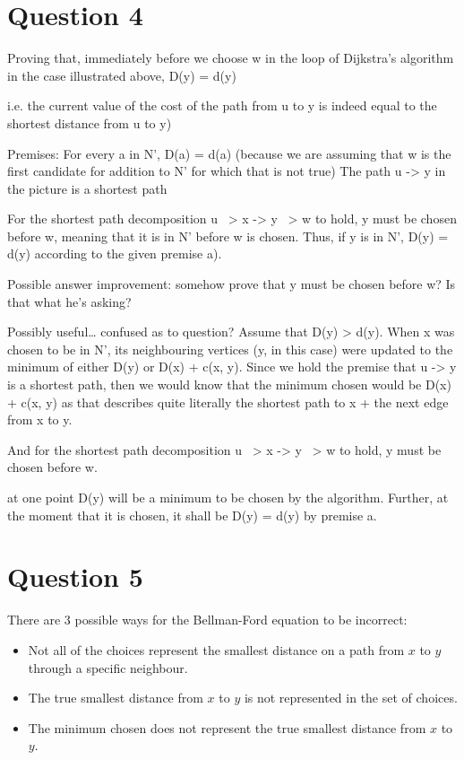 \documentclass[12pt]{article}
\begin{document}
\section*{Question 4}
Proving that, immediately before we choose w in the loop of Dijkstra’s algorithm in the case illustrated above, D(y) = d(y)

i.e. the current value of the cost of the path from u to y is indeed equal to the shortest distance from u to y)

Premises:
For every a in N’, D(a) = d(a) (because we are assuming that w is the first candidate for addition to N’ for which that is not true)
The path u -> y in the picture is a shortest path

For the shortest path decomposition u ~> x -> y ~> w to hold, y must be chosen before w, meaning that it is in N’ before w is chosen. Thus, if y is in N’, D(y) = d(y) according to the given premise a).

Possible answer improvement: somehow prove that y must be chosen before w? Is that what he’s asking?

Possibly useful… confused as to question?
Assume that D(y) > d(y). When x was chosen to be in N’, its neighbouring vertices (y, in this case) were updated to the minimum of either D(y) or D(x) + c(x, y). Since we hold the premise that u -> y is a shortest path, then we would know that the minimum chosen would be D(x) + c(x, y) as that describes quite literally the shortest path to x + the next edge from x to y.

And for the shortest path decomposition u ~> x -> y ~> w to hold, y must be chosen before w.

at one point D(y) will be a minimum to be chosen by the algorithm. Further, at the moment that it is chosen, it shall be D(y) = d(y) by premise a.

\section*{Question 5}
There are 3 possible ways for the Bellman-Ford equation to be incorrect:
\begin{itemize}
\item Not all of the choices represent the smallest distance on a path from $x$ to $y$ through a specific neighbour.
\item The true smallest distance from $x$ to $y$ is not represented in the set of choices.
\item The minimum chosen does not represent the true smallest distance from $x$ to $y$.
\end{itemize}
\end{document}
